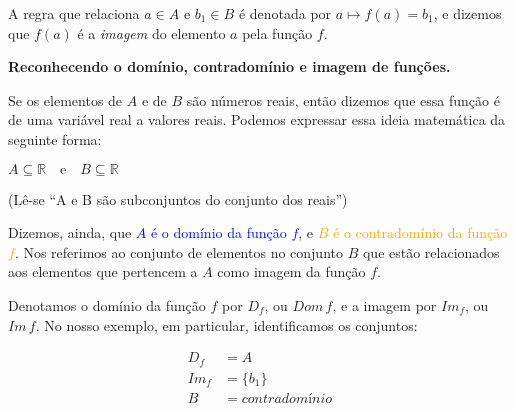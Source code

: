 \documentclass[12pt,openright,twoside,a4paper]{article}
\theoremstyle{definition}
\begin{document}
	A regra que relaciona $a \in A$ e $b_1 \in B$ é denotada por $a \mapsto f(a) = b_1$, e dizemos que $f(a)$ é a \textit{imagem} do elemento $a$ pela função $f$.

	
	\textbf{Reconhecendo o domínio, contradomínio e imagem de funções.}
	
	Se os elementos de $A$ e de $B$ são números reais, então dizemos que essa função é de uma variável real a valores reais. Podemos expressar essa ideia matemática da seguinte forma:
	
	\begin{center}
		$A \subseteq \mathbb{R} \quad \text{e} \quad B \subseteq \mathbb{R}$
		
		(Lê-se ``A e B são subconjuntos do conjunto dos reais'')
	\end{center}

	
	Dizemos, ainda, que \textcolor{blue}{$A$ é o domínio da função $f$}, e \textcolor{orange}{$B$ é o contradomínio da função $f$}. Nos referimos ao conjunto de elementos no conjunto $B$ que estão relacionados aos elementos que pertencem a $A$ como imagem da função $f$.
	
	Denotamos o domínio da função $f$ por $D_f$, ou $Dom\,f$, e a imagem por $Im_f$, ou $Im\,f$. No nosso exemplo, em particular, identificamos os conjuntos:
	
	\begin{align*}
		D_f &= A\\
		Im_f &= \{b_1\}\\
		B &= contradomínio
	\end{align*}
	
\end{document}
